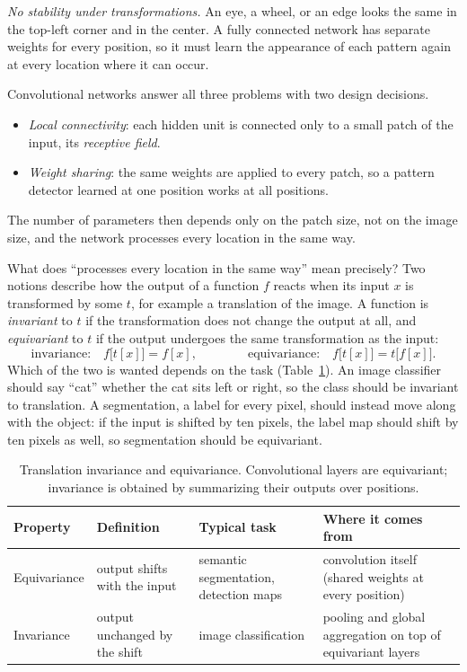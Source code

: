 \emph{No stability under transformations.} An eye, a wheel, or an edge looks the
same in the top-left corner and in the center. A fully connected network has
separate weights for every position, so it must learn the appearance of each
pattern again at every location where it can occur.

Convolutional networks answer all three problems with two design decisions.
\begin{itemize}
  \item \emph{Local connectivity}: each hidden unit is connected only to a small
        patch of the input, its \emph{receptive field}.
  \item \emph{Weight sharing}: the same weights are applied to every patch, so a
        pattern detector learned at one position works at all positions.
\end{itemize}
\noindent
The number of parameters then depends only on the patch size, not on the image
size, and the network processes every location in the same way.

What does ``processes every location in the same way'' mean precisely? Two
notions describe how the output of a function $f$ reacts when its input $x$ is
transformed by some $t$, for example a translation of the image. A function is
\emph{invariant} to $t$ if the transformation does not change the output at all,
and \emph{equivariant} to $t$ if the output undergoes the same transformation as
the input:
\begin{equation}
  \text{invariance:}\quad f\bigl[t[x]\bigr] = f[x],
  \qquad\qquad
  \text{equivariance:}\quad f\bigl[t[x]\bigr] = t\bigl[f[x]\bigr].
\end{equation}
\noindent
Which of the two is wanted depends on the task (Table~\ref{tab:inv-equiv}). An
image classifier should say ``cat'' whether the cat sits left or right, so the
class should be invariant to translation. A segmentation, a label for every
pixel, should instead move along with the object: if the input is shifted by ten
pixels, the label map should shift by ten pixels as well, so segmentation should
be equivariant.

\begin{table}[ht]
  \centering
  \begin{tabular}{@{}p{2.6cm}p{3.7cm}p{3.1cm}p{4.2cm}@{}}
    \toprule
    Property & Definition & Typical task & Where it comes from \\
    \midrule
    Equivariance & output shifts with the input &
      semantic segmentation, detection maps &
      convolution itself (shared weights at every position) \\
    Invariance & output unchanged by the shift &
      image classification &
      pooling and global aggregation on top of equivariant layers \\
    \bottomrule
  \end{tabular}
  \caption{Translation invariance and equivariance. Convolutional layers are
  equivariant; invariance is obtained by summarizing their outputs over
  positions.}
  \label{tab:inv-equiv}
\end{table}


